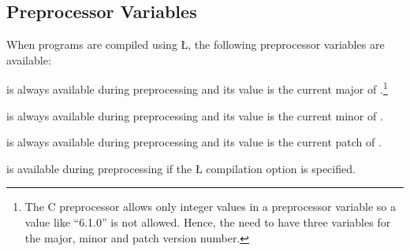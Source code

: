 \documentclass[openright,twoside]{report}
\newcommand{\Version}{6.1.0}
\begin{document}
\subsection{Preprocessor Variables}
\label{s:PreprocessorVariables}

When programs are compiled using \LGinlinetrue\LGbegin\lgrinde\L{}\endlgrinde\LGend{}, the following preprocessor variables are available:
\begin{prefix}
\item[\LGinlinetrue\LGbegin\lgrinde\L{\LB{\V{\_\_U\_CPLUSPLUS\_\_}}}\endlgrinde\LGend{}]
is always available during preprocessing and its value is the current major  of \uC.\footnote{
The C preprocessor allows only integer values in a preprocessor variable so a value like ``\Version'' is not allowed.
Hence, the need to have three variables for the major, minor and patch version number.}

\item[\LGinlinetrue\LGbegin\lgrinde\L{\LB{\V{\_\_U\_CPLUSPLUS\_MINOR\_\_}}}\endlgrinde\LGend{}]
is always available during preprocessing and its value is the current minor  of \uC.

\item[\LGinlinetrue\LGbegin\lgrinde\L{\LB{\V{\_\_U\_CPLUSPLUS\_PATCH\_\_}}}\endlgrinde\LGend{}]
is always available during preprocessing and its value is the current patch  of \uC.

\item[\LGinlinetrue\LGbegin\lgrinde\L{\LB{\V{\_\_U\_DEBUG\_\_}}}\endlgrinde\LGend{}]
is available during preprocessing if the \LGinlinetrue\LGbegin\lgrinde\L{}\endlgrinde\LGend{} compilation option is specified.


\end{prefix}
\end{document}
